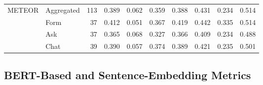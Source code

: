 \begin{table}
\begin{tabular}{@{}l l r r r r r r r r@{}}
\midrule
\multirow{4}{*}{METEOR}  & Aggregated  & 113 & 0.389 & 0.062 & 0.359 & 0.388 & 0.431 & 0.234 & 0.514 \\
                         & Form & 37  & 0.412 & 0.051 & 0.367 & 0.419 & 0.442 & 0.335 & 0.514 \\
                         & Ask  & 37  & 0.365 & 0.068 & 0.327 & 0.366 & 0.409 & 0.234 & 0.488 \\
                         & Chat & 39  & 0.390 & 0.057 & 0.374 & 0.389 & 0.421 & 0.235 & 0.501 \\
\bottomrule
\end{tabular}
\end{table}

\subsection{BERT-Based and Sentence-Embedding Metrics}
\label{app:items-nlp-doc-bert}

